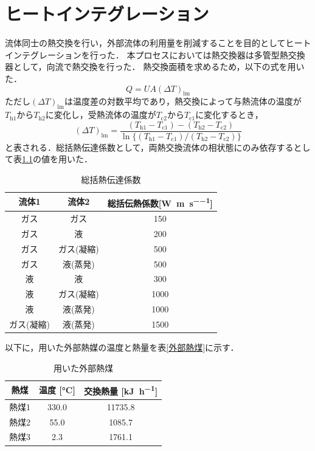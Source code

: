 \documentclass[a4j]{jsreport}
\begin{document}
\clearpage
\chapter{ヒートインテグレーション}
流体同士の熱交換を行い，外部流体の利用量を削減することを目的としてヒートインテグレーションを行った．
本プロセスにおいては熱交換器は多管型熱交換器として，向流で熱交換を行った．
熱交換面積を求めるため，以下の式を用いた．
\begin{equation}
    Q=UA(\varDelta T)_\mathrm{lm}
\end{equation}
ただし$(\varDelta T)_\mathrm{lm}$は温度差の対数平均であり，熱交換によって与熱流体の温度が$T_\mathrm{h1}$から$T_\mathrm{h2}$に変化し，受熱流体の温度が$T_\mathrm{c2}$から$T_\mathrm{c1}$に変化するとき，
\begin{equation}
    (\varDelta T)_\mathrm{lm} = \frac{(T_\mathrm{h1} - T_\mathrm{c1}) - (T_\mathrm{h2} - T_\mathrm{c2})}{\ln\{(T_\mathrm{h1} - T_\mathrm{c1}) / (T_\mathrm{h2} - T_\mathrm{c2})\}}
\end{equation}
と表される．総括熱伝達係数として，両熱交換流体の相状態にのみ依存するとして表\ref{総括熱伝達係数}の値を用いた．
\begin{table}[htbp]
  \centering
  \caption{総括熱伝達係数}
  \label{総括熱伝達係数}
  \begin{tabular}{ccc}
    \hline
    流体1 & 流体2 & 総括伝熱係数[\si{\watt \per \metre \per \second}] \\
    \hline
    ガス & ガス &150 \\
    ガス & 液 &200 \\
    ガス & ガス(凝縮) & 500 \\
    ガス & 液(蒸発) & 500 \\
    液 & 液 & 300 \\
    液 & ガス(凝縮) & 1000 \\
    液 & 液(蒸発) & 1000 \\
    ガス(凝縮) & 液(蒸発) &1500 \\
    \hline
  \end{tabular}
\end{table}

以下に，用いた外部熱媒の温度と熱量を表\ref{外部熱煤}に示す．
\begin{table}
  \centering
  \caption{用いた外部熱煤}
  \label{用いた外部熱煤}
  \begin{tabular}{ccc}
    \hline
    熱煤 & 温度 [\si{\degreeCelsius}] & 交換熱量 [\si{\kilo \joule \per \hour}] \\
    \hline
    熱煤1 & 330.0 & 11735.8 \\
    熱煤2 & 55.0 & 1085.7 \\
    熱煤3 & 2.3 & 1761.1 \\
    \hline
  \end{tabular}
\end{table}
\end{document}
